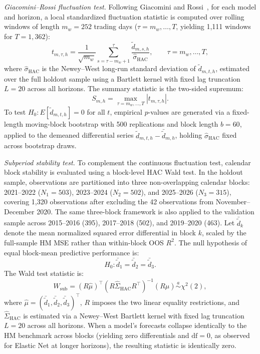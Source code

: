 \documentclass[12pt,twoside]{ord}
\begin{document}
\textit{Giacomini--Rossi fluctuation test.} Following Giacomini and Rossi~\cite{giacomini2010}, for each model and horizon, a local standardized fluctuation statistic is computed over rolling windows of length $m_w=252$ trading days ($\tau=m_w,\ldots,T$, yielding 1,111 windows for $T=1,362$):
\begin{equation}
t_{m,\tau,h}
=
\frac{1}{\sqrt{m_w}}
\sum_{s=\tau-m_w+1}^{\tau}
\frac{\widetilde d_{m,s,h}}{\widehat\sigma_{\mathrm{HAC}}},
\qquad
\tau=m_w,\ldots,T,
\end{equation}
where $\widehat\sigma_{\mathrm{HAC}}$ is the Newey--West long-run standard deviation of $\widetilde d_{m,t,h}$, estimated over the full holdout sample using a Bartlett kernel with fixed lag truncation $L=20$ across all horizons. The summary statistic is the two-sided supremum:
\begin{equation}
S_{m,h}
=
\max_{\tau=m_w,\ldots,T}
|t_{m,\tau,h}|.
\end{equation}
To test $H_0:E[\widetilde d_{m,t,h}]=0$ for all $t$, empirical $p$-values are generated via a fixed-length moving-block bootstrap with 500 replications and block length $b=60$, applied to the demeaned differential series $\widetilde d_{m,t,h}-\bar{\widetilde d}_{m,h}$, holding $\widehat\sigma_{\mathrm{HAC}}$ fixed across bootstrap draws.

\textit{Subperiod stability test.} To complement the continuous fluctuation test, calendar block stability is evaluated using a block-level HAC Wald test. In the holdout sample, observations are partitioned into three non-overlapping calendar blocks: 2021--2022 ($N_1=503$), 2023--2024 ($N_2=502$), and 2025--2026 ($N_3=315$), covering 1,320 observations after excluding the 42 observations from November--December 2020. The same three-block framework is also applied to the validation sample across 2015--2016 (395), 2017--2018 (502), and 2019--2020 (463). Let $\bar{\widetilde d}_k$ denote the mean normalized squared error differential in block $k$, scaled by the full-sample HM MSE rather than within-block OOS $R^2$. The null hypothesis of equal block-mean predictive performance is:
\begin{equation}
H_0:
\bar{\widetilde d}_1
=
\bar{\widetilde d}_2
=
\bar{\widetilde d}_3.
\end{equation}
The Wald test statistic is:
\begin{equation}
W_{\mathrm{sub}}
=
(R\widehat\mu)^\top
(R\widehat\Sigma_{\mathrm{HAC}}R^\top)^{-1}
(R\widehat\mu)
\overset{a}{\sim}\chi^2(2),
\end{equation}
where $\widehat\mu=(\bar{\widetilde d}_1,\bar{\widetilde d}_2,\bar{\widetilde d}_3)^\top$, $R$ imposes the two linear equality restrictions, and $\widehat\Sigma_{\mathrm{HAC}}$ is estimated via a Newey--West Bartlett kernel with fixed lag truncation $L=20$ across all horizons. When a model's forecasts collapse identically to the HM benchmark across blocks (yielding zero differentials and $\mathrm{df}=0$, as observed for Elastic Net at longer horizons), the resulting statistic is identically zero.
\end{document}
